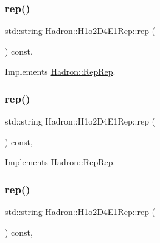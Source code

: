 \subsubsection{\texorpdfstring{rep()}{rep()}\hspace{0.1cm}{\footnotesize\ttfamily [1/3]}}
{\footnotesize\ttfamily std\+::string Hadron\+::\+H1o2\+D4\+E1\+Rep\+::rep (\begin{DoxyParamCaption}{ }\end{DoxyParamCaption}) const\hspace{0.3cm}{\ttfamily [inline]}, {\ttfamily [virtual]}}



Implements \mbox{\hyperlink{structHadron_1_1RepRep_ab3213025f6de249f7095892109575fde}{Hadron\+::\+Rep\+Rep}}.

\mbox{\label{structHadron_1_1H1o2D4E1Rep_a8657044b2491eb10846bc082432edb8e}} 
\subsubsection{\texorpdfstring{rep()}{rep()}\hspace{0.1cm}{\footnotesize\ttfamily [2/3]}}
{\footnotesize\ttfamily std\+::string Hadron\+::\+H1o2\+D4\+E1\+Rep\+::rep (\begin{DoxyParamCaption}{ }\end{DoxyParamCaption}) const\hspace{0.3cm}{\ttfamily [inline]}, {\ttfamily [virtual]}}



Implements \mbox{\hyperlink{structHadron_1_1RepRep_ab3213025f6de249f7095892109575fde}{Hadron\+::\+Rep\+Rep}}.

\mbox{\label{structHadron_1_1H1o2D4E1Rep_a8657044b2491eb10846bc082432edb8e}} 
\subsubsection{\texorpdfstring{rep()}{rep()}\hspace{0.1cm}{\footnotesize\ttfamily [3/3]}}
{\footnotesize\ttfamily std\+::string Hadron\+::\+H1o2\+D4\+E1\+Rep\+::rep (\begin{DoxyParamCaption}{ }\end{DoxyParamCaption}) const\hspace{0.3cm}{\ttfamily [inline]}, {\ttfamily [virtual]}}



